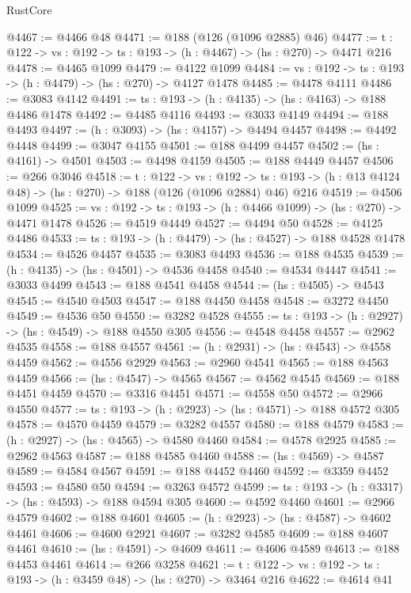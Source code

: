 \begin{lexlean}{RustCore}
\begin{coremodule}
@4467 := @4466 @48
@4471 := @188 (@126 (@1096 @2885) @46)
@4477 := {t : @122} -> {vs : @192} -> {ts : @193} -> (h : @4467) -> (hs : @270) -> @4471 @216
@4478 := @4465 @1099
@4479 := @4122 @1099
@4484 := {vs : @192} -> {ts : @193} -> (h : @4479) -> (hs : @270) -> @4127 @1478
@4485 := @4478 @4111
@4486 := @3083 @4142
@4491 := {ts : @193} -> (h : @4135) -> (hs : @4163) -> @188 @4486 @1478
@4492 := @4485 @4116
@4493 := @3033 @4149
@4494 := @188 @4493
@4497 := (h : @3093) -> (hs : @4157) -> @4494 @4457
@4498 := @4492 @4448
@4499 := @3047 @4155
@4501 := @188 @4499 @4457
@4502 := (hs : @4161) -> @4501
@4503 := @4498 @4159
@4505 := @188 @4449 @4457
@4506 := @266 @3046
@4518 := {t : @122} ->
  {vs : @192} ->
  {ts : @193} -> (h : @13 @4124 @48) -> (hs : @270) -> @188 (@126 (@1096 @2884) @46) @216
@4519 := @4506 @1099
@4525 := {vs : @192} -> {ts : @193} -> (h : @4466 @1099) -> (hs : @270) -> @4471 @1478
@4526 := @4519 @4449
@4527 := @4494 @50
@4528 := @4125 @4486
@4533 := {ts : @193} -> (h : @4479) -> (hs : @4527) -> @188 @4528 @1478
@4534 := @4526 @4457
@4535 := @3083 @4493
@4536 := @188 @4535
@4539 := (h : @4135) -> (hs : @4501) -> @4536 @4458
@4540 := @4534 @4447
@4541 := @3033 @4499
@4543 := @188 @4541 @4458
@4544 := (hs : @4505) -> @4543
@4545 := @4540 @4503
@4547 := @188 @4450 @4458
@4548 := @3272 @4450
@4549 := @4536 @50
@4550 := @3282 @4528
@4555 := {ts : @193} -> (h : @2927) -> (hs : @4549) -> @188 @4550 @305
@4556 := @4548 @4458
@4557 := @2962 @4535
@4558 := @188 @4557
@4561 := (h : @2931) -> (hs : @4543) -> @4558 @4459
@4562 := @4556 @2929
@4563 := @2960 @4541
@4565 := @188 @4563 @4459
@4566 := (hs : @4547) -> @4565
@4567 := @4562 @4545
@4569 := @188 @4451 @4459
@4570 := @3316 @4451
@4571 := @4558 @50
@4572 := @2966 @4550
@4577 := {ts : @193} -> (h : @2923) -> (hs : @4571) -> @188 @4572 @305
@4578 := @4570 @4459
@4579 := @3282 @4557
@4580 := @188 @4579
@4583 := (h : @2927) -> (hs : @4565) -> @4580 @4460
@4584 := @4578 @2925
@4585 := @2962 @4563
@4587 := @188 @4585 @4460
@4588 := (hs : @4569) -> @4587
@4589 := @4584 @4567
@4591 := @188 @4452 @4460
@4592 := @3359 @4452
@4593 := @4580 @50
@4594 := @3263 @4572
@4599 := {ts : @193} -> (h : @3317) -> (hs : @4593) -> @188 @4594 @305
@4600 := @4592 @4460
@4601 := @2966 @4579
@4602 := @188 @4601
@4605 := (h : @2923) -> (hs : @4587) -> @4602 @4461
@4606 := @4600 @2921
@4607 := @3282 @4585
@4609 := @188 @4607 @4461
@4610 := (hs : @4591) -> @4609
@4611 := @4606 @4589
@4613 := @188 @4453 @4461
@4614 := @266 @3258
@4621 := {t : @122} -> {vs : @192} -> {ts : @193} -> (h : @3459 @48) -> (hs : @270) -> @3464 @216
@4622 := @4614 @41

\end{coremodule}
\end{lexlean}
